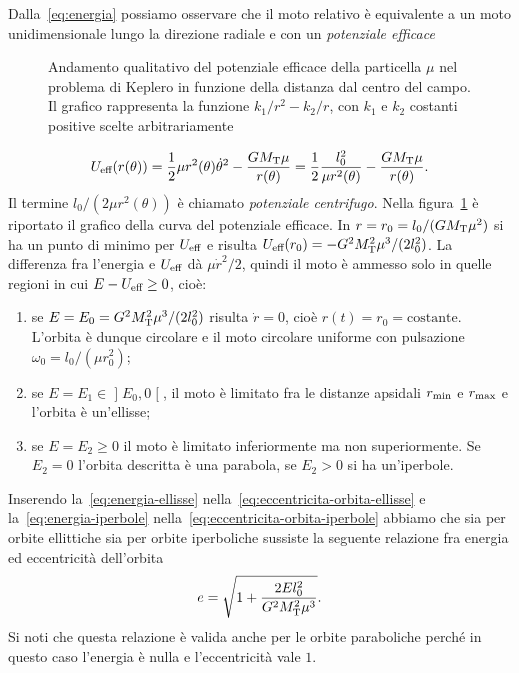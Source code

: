 {Dalla~\eqref{eq:energia} possiamo osservare che il moto relativo è equivalente a
un moto unidimensionale lungo la direzione radiale e con un \emph{potenziale
  efficace}
\begin{figure} %
  \centering
  
  \caption[Andamento del potenziale efficace in funzione della distanza dal
  centro del campo]{Andamento qualitativo del potenziale efficace della
    particella $\mu$ nel problema di Keplero in funzione della distanza dal
    centro del campo. Il grafico rappresenta la funzione $k_1/r^2-k_2/r$, con
    $k_1$ e $k_2$ costanti positive scelte arbitrariamente}
  \label{fig:potenziale-efficace}
\end{figure}
\begin{equation}
  U_\textup{eff}(r(\theta)) = \frac{1}{2}\mu r^2(\theta)\dot{\theta}^2 -
  \frac{GM_\textup{T}\mu}{r(\theta)} = \frac{1}{2}\frac{l_0^2}{\mu r^2(\theta)} -
  \frac{GM_\textup{T}\mu}{r(\theta)}.
\end{equation}
Il termine $l_0/(2\mu r^2(\theta))$ è chiamato \emph{potenziale
  centrifugo}. Nella figura~\ref{fig:potenziale-efficace} è riportato il grafico
della curva del potenziale efficace. In $r=r_0=l_0/(GM_\textup{T}\mu^2)$ si ha
un punto di minimo per $U_\textup{eff}$ e risulta $U_\textup{eff}(r_0) =
-G^2M_\textup{T}^2\mu^3/(2l_0^2)$. La differenza fra l'energia e
$U_\textup{eff}$ dà $\mu\dot{r}^2/2$, quindi il moto è ammesso solo in quelle
regioni in cui $E-U_\textup{eff}\geq 0$, cioè:
\begin{enumerate}
\item se $E = E_0 = G^2M_\textup{T}^2\mu^3/(2l_0^2)$ risulta $\dot{r}=0$, cioè
  $r(t) = r_0 = \text{costante}$. L'orbita è dunque circolare e il moto
  circolare uniforme con pulsazione $\omega_0 = l_0/(\mu r_0^2)$;
\item se $E = E_1 \in \mathopen{]}E_0,0\mathclose{[}$, il moto è limitato fra le
  distanze apsidali $r_\textup{min}$ e $r_\textup{max}$ e l'orbita è un'ellisse;
\item se $E = E_2 \geq 0$ il moto è limitato inferiormente ma non
  superiormente. Se $E_2 = 0$ l'orbita descritta è una parabola, se $E_2>0$ si
  ha un'iperbole.
\end{enumerate}

Inserendo la~\eqref{eq:energia-ellisse}
nella~\eqref{eq:eccentricita-orbita-ellisse} e la~\eqref{eq:energia-iperbole}
nella~\eqref{eq:eccentricita-orbita-iperbole} abbiamo che sia per orbite
ellittiche sia per orbite iperboliche sussiste la seguente relazione fra energia
ed eccentricità dell'orbita
\begin{equation}
  \label{eq:eccentricita-energia}
  e = \sqrt{1+\frac{2El_0^2}{G^2M_\textup{T}^2\mu^3}}.
\end{equation}
Si noti che questa relazione è valida anche per le orbite paraboliche perché in
questo caso l'energia è nulla e l'eccentricità vale $1$.

}
